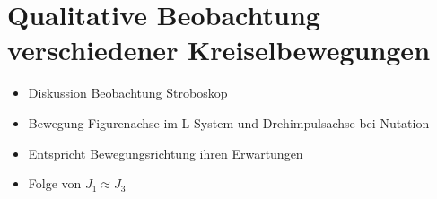 

\section{Qualitative Beobachtung verschiedener Kreiselbewegungen}

\begin{itemize}
    \item Diskussion Beobachtung Stroboskop
    \item Bewegung Figurenachse im L-System und Drehimpulsachse bei Nutation
    \item Entspricht Bewegungsrichtung ihren Erwartungen
    \item Folge von $J_1 \approx J_3$
\end{itemize}

